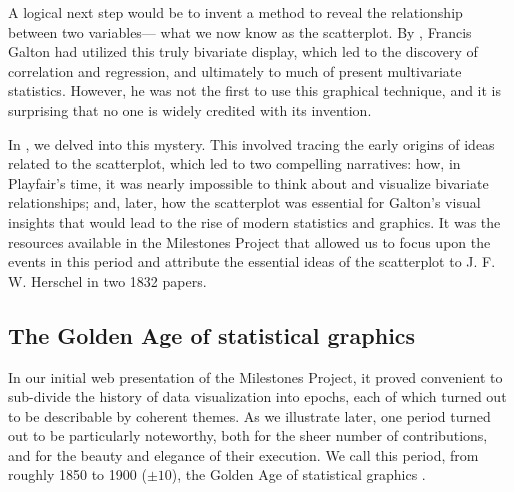 A logical next step would be to invent a method to reveal the relationship between two variables--- what we now know as the scatterplot.  By \citeyear{Galton:1886}, Francis Galton had utilized this truly bivariate display, which led to the
discovery of correlation and regression, and ultimately to much of present multivariate
statistics. 
However, he was not the first to use this graphical technique, and it is surprising that no one is widely credited with its invention.

In \citet{FriendlyDenis:05:scat}, we delved into this mystery.  This involved tracing the early origins of ideas related to the scatterplot, which led to two compelling narratives: how, in Playfair's time, it was nearly impossible to think about and visualize bivariate relationships; and, later, how the scatterplot was essential for Galton's visual insights that would lead to the rise of modern statistics and graphics. It was the resources available in the Milestones Project that allowed us to focus upon the events in this period and attribute the essential ideas of the scatterplot to J. F. W. Herschel in two 1832 papers.

\subsection{The Golden Age of statistical graphics}

In our initial web presentation of the Milestones Project, it proved convenient
to sub-divide the history of data visualization into epochs, each of which turned
out to be describable by coherent themes.  As we illustrate later, one
period turned out to be particularly noteworthy, both for the sheer number of
contributions, and for the beauty and elegance of their execution. We call this period, from roughly 1850 to 1900 ($\pm 10$), the Golden Age of statistical graphics \citep{Friendly:2008:golden}.

